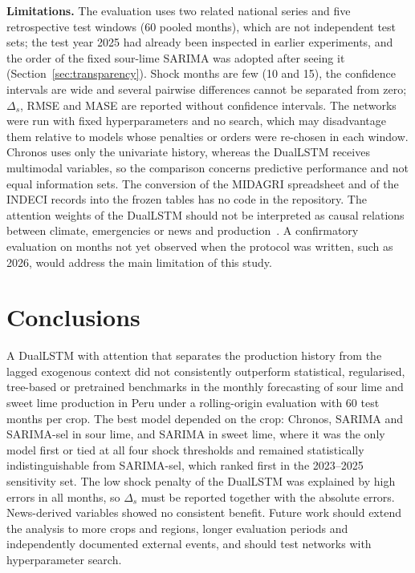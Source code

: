 \documentclass[forecasting,article,submit,moreauthors]{Definitions/mdpi}
\begin{document}
\textbf{Limitations.} The evaluation uses two related national series and five retrospective test windows (60 pooled months), which are not independent test sets; the test year 2025 had already been inspected in earlier experiments, and the order of the fixed sour-lime SARIMA was adopted after seeing it (Section~\ref{sec:transparency}). Shock months are few (10 and 15), the confidence intervals are wide and several pairwise differences cannot be separated from zero; $\Delta_s$, RMSE and MASE are reported without confidence intervals. The networks were run with fixed hyperparameters and no search, which may disadvantage them relative to models whose penalties or orders were re-chosen in each window. Chronos uses only the univariate history, whereas the DualLSTM receives multimodal variables, so the comparison concerns predictive performance and not equal information sets. The conversion of the MIDAGRI spreadsheet and of the INDECI records into the frozen tables has no code in the repository. The attention weights of the DualLSTM should not be interpreted as causal relations between climate, emergencies or news and production~\cite{jain2019attention}. A confirmatory evaluation on months not yet observed when the protocol was written, such as 2026, would address the main limitation of this study.

\section{Conclusions}

A DualLSTM with attention that separates the production history from the lagged exogenous context did not consistently outperform statistical, regularised, tree-based or pretrained benchmarks in the monthly forecasting of sour lime and sweet lime production in Peru under a rolling-origin evaluation with 60 test months per crop. The best model depended on the crop: Chronos, SARIMA and SARIMA-sel in sour lime, and SARIMA in sweet lime, where it was the only model first or tied at all four shock thresholds and remained statistically indistinguishable from SARIMA-sel, which ranked first in the 2023--2025 sensitivity set. The low shock penalty of the DualLSTM was explained by high errors in all months, so $\Delta_s$ must be reported together with the absolute errors. News-derived variables showed no consistent benefit. Future work should extend the analysis to more crops and regions, longer evaluation periods and independently documented external events, and should test networks with hyperparameter search.
\end{document}
